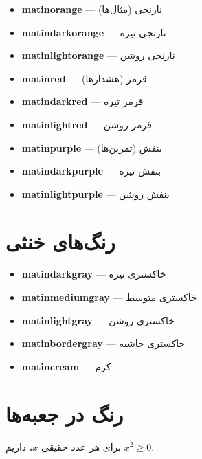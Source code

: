 \documentclass{matinbook}
\begin{document}
\begin{itemize}
    \item \textcolor{matinorange}{\textbf{matinorange}} — نارنجی (مثال‌ها)
    \item \textcolor{matindarkorange}{\textbf{matindarkorange}} — نارنجی تیره
    \item \textcolor{matinlightorange}{\textbf{matinlightorange}} — نارنجی روشن
    \item \textcolor{matinred}{\textbf{matinred}} — قرمز (هشدارها)
    \item \textcolor{matindarkred}{\textbf{matindarkred}} — قرمز تیره
    \item \textcolor{matinlightred}{\textbf{matinlightred}} — قرمز روشن
    \item \textcolor{matinpurple}{\textbf{matinpurple}} — بنفش (تمرین‌ها)
    \item \textcolor{matindarkpurple}{\textbf{matindarkpurple}} — بنفش تیره
    \item \textcolor{matinlightpurple}{\textbf{matinlightpurple}} — بنفش روشن
\end{itemize}

\section{رنگ‌های خنثی}
\label{sec:neutral-colors}

\begin{itemize}
    \item \textcolor{matindarkgray}{\textbf{matindarkgray}} — خاکستری تیره
    \item \textcolor{matinmediumgray}{\textbf{matinmediumgray}} — خاکستری متوسط
    \item \textcolor{matinlightgray}{\textbf{matinlightgray}} — خاکستری روشن
    \item \textcolor{matinbordergray}{\textbf{matinbordergray}} — خاکستری حاشیه
    \item \textcolor{matincream}{\textbf{matincream}} — کرم
\end{itemize}

\section{رنگ در جعبه‌ها}
\label{sec:colors-in-boxes}

\begin{theorem}
    برای هر عدد حقیقی $x$، داریم $x^2 \geq 0$.
\end{theorem}
\end{document}

